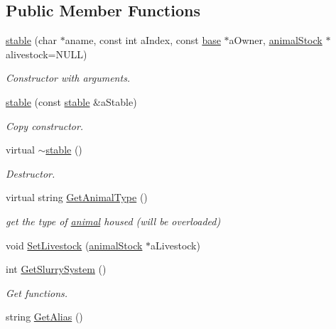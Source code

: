 \subsection*{Public Member Functions}
\begin{DoxyCompactItemize}
\item 
\hyperlink{classstable_a46222d79fa0c2eca30a5dfba0029302c}{stable} (char $\ast$aname, const int aIndex, const \hyperlink{classbase}{base} $\ast$aOwner, \hyperlink{classanimal_stock}{animalStock} $\ast$alivestock=NULL)
\begin{DoxyCompactList}\small\item\em Constructor with arguments. \item\end{DoxyCompactList}\item 
\hyperlink{classstable_adcfc503ae93e77c418caeda5828ded06}{stable} (const \hyperlink{classstable}{stable} \&aStable)
\begin{DoxyCompactList}\small\item\em Copy constructor. \item\end{DoxyCompactList}\item 
virtual \hyperlink{classstable_a56a41cc73948359a0a3ef1c77cef9c82}{$\sim$stable} ()
\begin{DoxyCompactList}\small\item\em Destructor. \item\end{DoxyCompactList}\item 
virtual string \hyperlink{classstable_af11653ccffcdc3bfb928d47485fc39b4}{GetAnimalType} ()
\begin{DoxyCompactList}\small\item\em get the type of \hyperlink{classanimal}{animal} housed (will be overloaded) \item\end{DoxyCompactList}\item 
void \hyperlink{classstable_a8d74bb1d63bc771084f2b94f1c1eed96}{SetLivestock} (\hyperlink{classanimal_stock}{animalStock} $\ast$aLivestock)
\item 
int \hyperlink{classstable_a478ddd9c5b91b0dcf03bbf08b2787b3a}{GetSlurrySystem} ()
\begin{DoxyCompactList}\small\item\em Get functions. \item\end{DoxyCompactList}\item 
string \hyperlink{classstable_a26fb43b0d40106a87ba9ae11425ac9c6}{GetAlias} ()

\end{DoxyCompactItemize}

